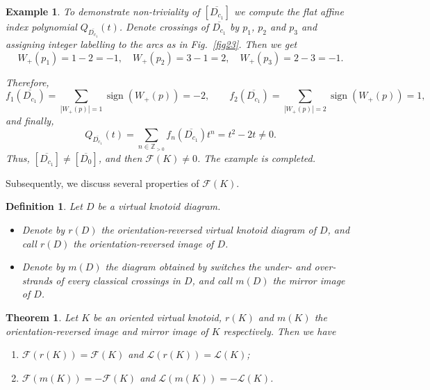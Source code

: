 \documentclass[11pt]{amsart}
\theoremstyle{noparens}
\newtheorem{theorem}{Theorem}[section]
\newtheorem{definition}{Definition}[section]
\newtheorem{example}{Example}[section]
\numberwithin{equation}{section}
\numberwithin{equation}{section}
\begin{document}
\begin{example}
{To demonstrate non-triviality of $[\overline{D_{c_1}}]$ we compute the flat affine index polynomial $Q_{\overline{D_{c_1}}} (t)$. Denote crossings of $\overline{D_{c_1}}$ by $p_1$, $p_2$ and $p_3$ and assigning integer labelling to the arcs as in Fig.~\ref{fig23}. Then we get 
$$
W_+(p_1) = 1 - 2 = -1, \quad W_+(p_2) = 3 - 1 = 2, \quad W_+(p_3) = 2-3=-1.
$$ 

Therefore,  
$$
f_1(\overline{D_{c_1}}) = \sum_{|W_+(p)| = 1} \operatorname{sign} (W_+(p)) = -2, \qquad  f_2(\overline{D_{c_1}}) = \sum_{|W_+(p)| = 2} \operatorname{sign} (W_+(p)) = 1,
$$ 
and finally, 
$$
Q_{\overline{D_{c_1}}} (t) = \sum_{n \in \mathbb{Z}_{>0}} f_n (\overline{D_{c_1}}) t^n = t^2 - 2t \neq 0. 
$$
Thus, $[\overline{D_{c_1}}] \neq [\overline{D_0}]$, and then $\mathcal{F} (K) \neq 0$. The example is completed. 
}
\end{example}

Subsequently, we discuss several properties of $\mathcal{F} (K)$.

\begin{definition} {\rm 
Let $D$ be a virtual knotoid diagram. 
\begin{itemize} 
\item Denote by $r(D)$ the orientation-reversed virtual knotoid diagram of $D$, and call $r(D)$ the \textit{orientation-reversed image} of $D$.
\item Denote by $m(D)$ the diagram obtained by switches the under- and over-strands of every classical crossings in $D$, and call $m(D)$ the \textit{mirror image} of $D$.
\end{itemize}
	}
\end{definition}

\begin{theorem} \label{th3.3}
Let $K$ be an oriented virtual knotoid, $r(K)$ and $m(K)$ the  orientation-reversed image and mirror image of $K$ respectively. Then we have
\begin{enumerate}
\item[{(1)}]
$\mathcal{F} (r(K) )=\mathcal{F} ( K )$ and $\mathcal{L} (r(K) )=\mathcal{L} ( K )$;
\item[{(2)}]
$\mathcal{F} ( m(K) )=-\mathcal{F} ( K )$ and $\mathcal{L} ( m(K) )=-\mathcal{L} ( K )$.
\end{enumerate}
\end{theorem}
  
\end{document}
